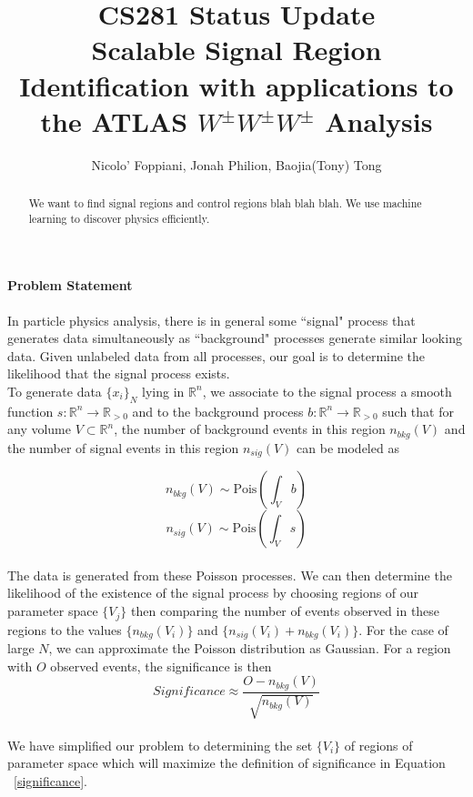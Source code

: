 \documentclass[11pt]{article}
\title{CS281 Status Update \\
	\large Scalable Signal Region Identification with applications to the ATLAS $W^\pm W^\pm W^\pm$ Analysis}
\author{Nicolo' Foppiani, Jonah Philion, Baojia(Tony) Tong}
\date{}                                           %
\begin{document}
\maketitle

\renewcommand{\abstractname}{Abstract}
\begin{abstract}
We want to find signal regions and control regions blah blah blah. We use machine learning to discover physics efficiently.
\end{abstract}

\paragraph{Problem Statement}
In particle physics analysis, there is in general some ``signal" process that generates data simultaneously as ``background" processes generate similar looking data. Given unlabeled data from all processes, our goal is to determine the likelihood that the signal process exists.\\
To generate data $\{x_i\}_N$ lying in $\mathbb{R}^n$, we associate to the signal process a smooth function $s: \mathbb{R}^n \rightarrow \mathbb{R}_{> 0}$ and to the background process $b: \mathbb{R}^n \rightarrow \mathbb{R}_{> 0}$ such that for any volume $V \subset \mathbb{R}^n$, the number of background events in this region $n_{bkg}(V)$ and the number of signal events in this region $n_{sig}(V)$ can  be modeled as 

\[ n_{bkg}(V) \sim \text{Pois} \left( \int_V b \right)\]
\[n_{sig}(V) \sim \text{Pois} \left( \int_V s \right) \]

\paragraph{}
The data is generated from these Poisson processes. We can then determine the likelihood of the existence of the signal process by choosing regions of our parameter space $\{V_j\}$ then comparing the number of events observed in these regions to the values $\{n_{bkg}(V_i)\}$ and $\{n_{sig}(V_i) + n_{bkg}(V_i)\}$. For the case of large $N$, we can approximate the Poisson distribution as Gaussian. For a region with $O$ observed events, the significance is then
\begin{equation}
Significance \approx \frac{O-n_{bkg}(V)}{\sqrt{n_{bkg}(V)}}
\label{significance}
\end{equation}

\paragraph{}
We have simplified our problem to determining the set $\{V_i\}$ of regions of parameter space which will maximize the definition of significance in Equation ~\ref{significance}.
\end{document}

